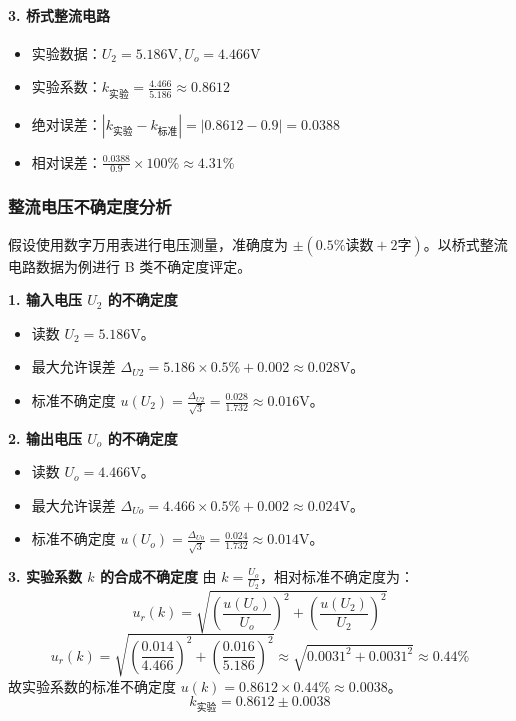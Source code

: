 \documentclass[]{../../templates/Report}%
\begin{document}
\begin{fullreportonly}
    \paragraph{3. 桥式整流电路}
    \begin{itemize}
        \item 实验数据：$U_2 = 5.186\text{V}, U_o = 4.466\text{V}$
        \item 实验系数：$k_{\text{实验}} = \frac{4.466}{5.186} \approx 0.8612$
        \item 绝对误差：$|k_{\text{实验}} - k_{\text{标准}}| = |0.8612 - 0.9| = 0.0388$
        \item 相对误差：$\frac{0.0388}{0.9} \times 100\% \approx 4.31\%$
    \end{itemize}

    \subsubsection{整流电压不确定度分析}
    假设使用数字万用表进行电压测量，准确度为 $\pm(0.5\% \text{读数} + 2\text{字})$。以桥式整流电路数据为例进行 B 类不确定度评定。

    \textbf{1. 输入电压 $U_2$ 的不确定度}
    \begin{itemize}
        \item 读数 $U_2 = 5.186\text{V}$。
        \item 最大允许误差 $\Delta_{U2} = 5.186 \times 0.5\% + 0.002 \approx 0.028\text{V}$。
        \item 标准不确定度 $u(U_2) = \frac{\Delta_{U2}}{\sqrt{3}} = \frac{0.028}{1.732} \approx 0.016\text{V}$。
    \end{itemize}

    \textbf{2. 输出电压 $U_o$ 的不确定度}
    \begin{itemize}
        \item 读数 $U_o = 4.466\text{V}$。
        \item 最大允许误差 $\Delta_{Uo} = 4.466 \times 0.5\% + 0.002 \approx 0.024\text{V}$。
        \item 标准不确定度 $u(U_o) = \frac{\Delta_{Uo}}{\sqrt{3}} = \frac{0.024}{1.732} \approx 0.014\text{V}$。
    \end{itemize}

    \textbf{3. 实验系数 $k$ 的合成不确定度}
    由 $k = \frac{U_o}{U_2}$，相对标准不确定度为：
    $$ u_r(k) = \sqrt{\left(\frac{u(U_o)}{U_o}\right)^2 + \left(\frac{u(U_2)}{U_2}\right)^2} $$
    $$ u_r(k) = \sqrt{\left(\frac{0.014}{4.466}\right)^2 + \left(\frac{0.016}{5.186}\right)^2} \approx \sqrt{0.0031^2 + 0.0031^2} \approx 0.44\% $$
    故实验系数的标准不确定度 $u(k) = 0.8612 \times 0.44\% \approx 0.0038$。
    $$ k_{\text{实验}} = 0.8612 \pm 0.0038 $$


\end{fullreportonly}
\end{document}
